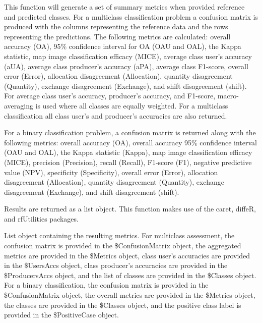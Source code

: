 \documentclass[a4paper]{book}
\begin{document}
%
\begin{Details}\relax
This function will generate a set of summary metrics when provided
reference and predicted classes. For a multiclass classification problem
a confusion matrix is produced with the columns representing the reference
data and the rows representing the predictions. The following metrics are
calculated: overall accuracy (OA), 95\% confidence interval for OA
(OAU and OAL), the Kappa statistic, map image classification
efficacy (MICE), average class user's accuracy (aUA), average class
producer's accuracy (aPA), average class F1-score, overall error (Error),
allocation disagreement (Allocation), quantity disagreement (Quantity),
exchange disagreement (Exchange), and shift disagreement (shift). For average
class user's accuracy, producer's accuracy, and F1-score, macro-averaging
is used where all classes are equally weighted. For a multiclass classification
all class user's and producer's accuracies are also returned.

For a binary classification problem, a confusion matrix is returned
along with the following metrics: overall accuracy (OA), overall accuracy
95\% confidence interval (OAU and OAL), the Kappa statistic (Kappa), map
image classification efficacy (MICE), precision (Precision), recall (Recall),
F1-score (F1), negative predictive value (NPV), specificity (Specificity),
overall error (Error), allocation disagreement (Allocation), quantity
disagreement (Quantity), exchange disagreement (Exchange), and shift
disagreement (shift).

Results are returned as a list object. This function makes use of the caret,
diffeR, and rfUtilities packages.
\end{Details}
%
\begin{Value}
List object containing the resulting metrics. For multiclass assessment,
the confusion matrix is provided in the \$ConfusionMatrix object, the aggregated
metrics are provided in the \$Metrics object, class user's accuracies are provided
in the \$UsersAccs object, class producer's accuracies are provided in the
\$ProducersAccs object, and the list of classes are provided in the \$Classes object.
For a binary classification, the confusion matrix is provided in the
\$ConfusionMatrix object, the overall metrics are provided in the \$Metrics object,
the classes are provided in the \$Classes object, and the positive class label is
provided in the \$PositiveCase object.
\end{Value}
\end{document}
